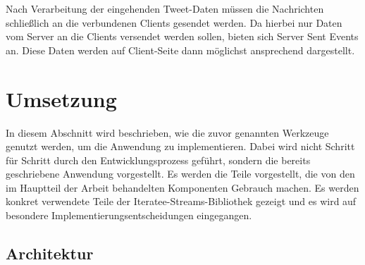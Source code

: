 Nach Verarbeitung der eingehenden Tweet-Daten müssen die Nachrichten schließlich an die verbundenen Clients gesendet werden.
Da hierbei nur Daten vom Server an die Clients versendet werden sollen, bieten sich Server Sent Events an.
Diese Daten werden auf Client-Seite dann möglichst ansprechend dargestellt.


\section{Umsetzung} %
\label{sec:umsetzung}

In diesem Abschnitt wird beschrieben, wie die zuvor genannten Werkzeuge genutzt werden, um die Anwendung zu implementieren.
Dabei wird nicht Schritt für Schritt durch den Entwicklungsprozess geführt, sondern die bereits geschriebene Anwendung vorgestellt.
Es werden die Teile vorgestellt, die  von den im Hauptteil der Arbeit behandelten Komponenten Gebrauch machen.
Es werden konkret verwendete Teile der Iteratee-Streams-Bibliothek gezeigt und es wird auf besondere Implementierungsentscheidungen eingegangen.

\subsection{Architektur} %
\label{sub:architektur}


